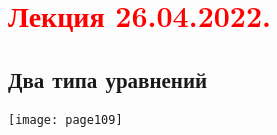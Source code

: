 \documentclass[main.tex]{subfiles}
\begin{document}
\section{\textcolor{red}{Лекция 26.04.2022.}}

\subsection{Два типа уравнений}
\texttt{[image: page109]}






\end{document}
